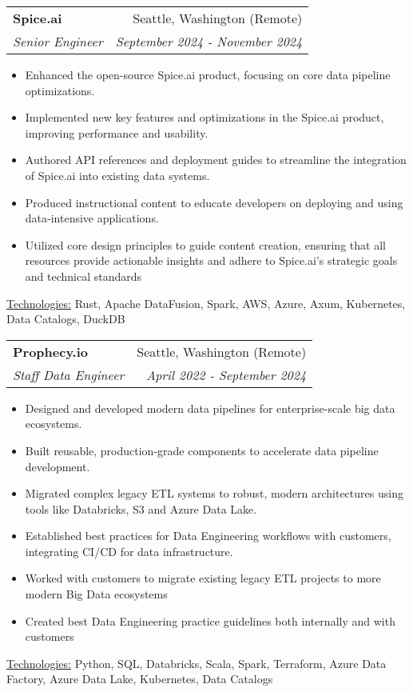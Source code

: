 \documentclass[letterpaper,11pt]{article}
\makeatletter
\newcommand{\resumeItem}[1]{%
  \item\small{
    #1
  }
}
\newcommand{\resumeSubheading}[4]{
  \vspace{8pt}\item%
    \begin{tabular*}{0.97\textwidth}[t]{l@{\extracolsep{\fill}}r}
      \textbf{#1} & #2 \\
      \textit{\small#3} & \textit{\small #4} \\
    \end{tabular*}\vspace{-5pt}
}
\newcommand{\resumeItemListStart}{\begin{itemize}}
\newcommand{\resumeItemListEnd}{\end{itemize}\vspace{-5pt}}
\newcommand{\resumeTech}[2]{
 \underline{#1:} #2
}
\makeatother
\begin{document}
      \resumeSubheading
      {Spice.ai}{Seattle, Washington (Remote)}
      {Senior Engineer}{September 2024 - November 2024}
      \resumeItemListStart
      \resumeItem{Enhanced the open-source Spice.ai product, focusing on core data pipeline optimizations.}
      \resumeItem{Implemented new key features and optimizations in the Spice.ai product, improving performance and usability.}
      \resumeItem{Authored API references and deployment guides to streamline the integration of Spice.ai into existing data systems.}
      \resumeItem{Produced instructional content to educate developers on deploying and using data-intensive applications.}
      \resumeItem{Utilized core design principles to guide content creation, ensuring that all resources provide actionable insights and adhere to Spice.ai's strategic goals and technical standards}
      \resumeItemListEnd
      \resumeTech{Technologies}{Rust, Apache DataFusion, Spark, AWS, Azure, Axum, Kubernetes, Data Catalogs, DuckDB}\\

    \resumeSubheading
      {Prophecy.io}{Seattle, Washington (Remote)}
      {Staff Data Engineer}{April 2022 - September 2024}
      \resumeItemListStart
      \resumeItem{Designed and developed modern data pipelines for enterprise-scale big data ecosystems.}
      \resumeItem{Built reusable, production-grade components to accelerate data pipeline development.}
      \resumeItem{Migrated complex legacy ETL systems to robust, modern architectures using tools like Databricks, S3 and Azure Data Lake.}
      \resumeItem{Established best practices for Data Engineering workflows with customers, integrating CI/CD for data infrastructure.}
      \resumeItem{Worked with customers to migrate existing legacy ETL projects to more modern Big Data ecosystems}
      \resumeItem{Created best Data Engineering practice guidelines both internally and with customers}
      \resumeItemListEnd
      \resumeTech{Technologies}{Python, SQL, Databricks, Scala, Spark, Terraform, Azure Data Factory, Azure Data Lake, Kubernetes, Data Catalogs}\\
\end{document}
